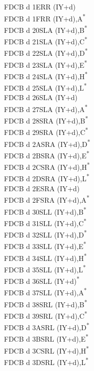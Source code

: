 \documentclass[oneside,a4paper]{book}
\begin{document}
\begin{multicols}{3}
{\begin{tabbing}
FDCB d 1E\>RR (IY+d)\\
FDCB d 1F\>RR (IY+d),A\textsuperscript{*}\\
FDCB d 20\>SLA (IY+d),B\textsuperscript{*}\\
FDCB d 21\>SLA (IY+d),C\textsuperscript{*}\\
FDCB d 22\>SLA (IY+d),D\textsuperscript{*}\\
FDCB d 23\>SLA (IY+d),E\textsuperscript{*}\\
FDCB d 24\>SLA (IY+d),H\textsuperscript{*}\\
FDCB d 25\>SLA (IY+d),L\textsuperscript{*}\\
FDCB d 26\>SLA (IY+d)\\
FDCB d 27\>SLA (IY+d),A\textsuperscript{*}\\
FDCB d 28\>SRA (IY+d),B\textsuperscript{*}\\
FDCB d 29\>SRA (IY+d),C\textsuperscript{*}\\
FDCB d 2A\>SRA (IY+d),D\textsuperscript{*}\\
FDCB d 2B\>SRA (IY+d),E\textsuperscript{*}\\
FDCB d 2C\>SRA (IY+d),H\textsuperscript{*}\\
FDCB d 2D\>SRA (IY+d),L\textsuperscript{*}\\
FDCB d 2E\>SRA (IY+d)\\
FDCB d 2F\>SRA (IY+d),A\textsuperscript{*}\\
FDCB d 30\>SLL (IY+d),B\textsuperscript{*}\\
FDCB d 31\>SLL (IY+d),C\textsuperscript{*}\\
FDCB d 32\>SLL (IY+d),D\textsuperscript{*}\\
FDCB d 33\>SLL (IY+d),E\textsuperscript{*}\\
FDCB d 34\>SLL (IY+d),H\textsuperscript{*}\\
FDCB d 35\>SLL (IY+d),L\textsuperscript{*}\\
FDCB d 36\>SLL (IY+d)\textsuperscript{*}\\
FDCB d 37\>SLL (IY+d),A\textsuperscript{*}\\
FDCB d 38\>SRL (IY+d),B\textsuperscript{*}\\
FDCB d 39\>SRL (IY+d),C\textsuperscript{*}\\
FDCB d 3A\>SRL (IY+d),D\textsuperscript{*}\\
FDCB d 3B\>SRL (IY+d),E\textsuperscript{*}\\
FDCB d 3C\>SRL (IY+d),H\textsuperscript{*}\\
FDCB d 3D\>SRL (IY+d),L\textsuperscript{*}\\

\end{tabbing}}
\end{multicols}
\end{document}
